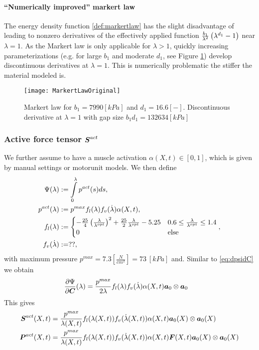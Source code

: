 \paragraph{``Numerically improved'' markert law}
The energy density function \eqref{def:markertlaw} has the slight disadvantage
of leading to nonzero derivatives of the effectively applied function $\frac{b_1}{\lambda^2}\left(\lambda^{d_1} - 1\right)$ near $\lambda=1$.
As the Markert law is only applicable for $\lambda>1$, quickly increasing parameterizations (e.g. for large $b_1$ and moderate $d_1$, see Figure \ref{fig:steepmarkert})
develop discontinuous derivatives at $\lambda=1$. This is numerically problematic the stiffer the material modeled is.
\begin{figure}[!ht]
	\texttt{[image: MarkertLawOriginal]}
	\caption{Markert law for $b_1=7990 [kPa]$ and $d_1=16.6 [-]$. Discontinuous derivative at $\lambda=1$ with gap size $b_1d_1=132634 [kPa]$}
	\label{fig:steepmarkert}
\end{figure}

\subsubsection{Active force tensor $\boldsymbol{S}^{act}$}\label{sec:active_force}
We further assume to have a muscle activation $\alpha(X,t) \in [0,1]$, which is given by manual settings or motorunit models.
We then define
\begin{align}
	\Psi(\lambda) &:= \int\limits_{0}^{\lambda} p^{act}(s)ds,\nonumber\\
	p^{act}(\lambda) &:= p^{max}f_l(\lambda)f_v(\dot{\lambda})\alpha(X,t),\nonumber\\
	f_l(\lambda) &:= \begin{cases}
		-\frac{25}{4}\left(\frac{\lambda}{\lambda^{opt}}\right)^2 + \frac{25}{2}\frac{\lambda}{\lambda^{opt}} - 5.25 & 0.6 \leq \frac{\lambda}{\lambda^{opt}} \leq 1.4\\ 
		0 & \text{else}
	\end{cases} \label{def:fl},\\
	f_v(\dot{\lambda}) &:= ??,
\end{align}
with maximum pressure $p^{max} = 7.3 \left[\frac{N}{cm^2}\right] = 73~[kPa]$ and.
Similar to \eqref{eq:dpsidC} we obtain
\begin{align}
	\frac{\partial \Psi}{\partial \boldsymbol{C}}(\lambda) &= \frac{p^{max}}{2\lambda}f_l(\lambda)f_v(\dot{\lambda})\alpha(X,t)\boldsymbol{a}_0\otimes\boldsymbol{a}_0
\end{align}
This gives
\begin{align}
	\boldsymbol{S}^{act}(X,t) &= \frac{p^{max}}{\lambda(X,t)}f_l(\lambda(X,t))f_v(\dot{\lambda}(X,t))\alpha(X,t)\boldsymbol{a}_0(X)\otimes\boldsymbol{a}_0(X)\\
	\boldsymbol{P}^{act}(X,t) &= \frac{p^{max}}{\lambda(X,t)}f_l(\lambda(X,t))f_v(\dot{\lambda}(X,t))\alpha(X,t)\boldsymbol{F}(X,t)\boldsymbol{a}_0(X)\otimes\boldsymbol{a}_0(X)
\end{align}


